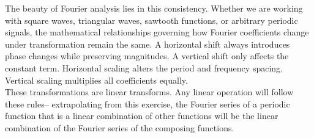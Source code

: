 \documentclass{article}
\begin{document}
The beauty of Fourier analysis lies in this consistency. Whether we are working with square waves, triangular waves, sawtooth functions, or arbitrary periodic signals, the mathematical relationships governing how Fourier coefficients change under transformation remain the same. A horizontal shift always introduces phase changes while preserving magnitudes. A vertical shift only affects the constant term. Horizontal scaling alters the period and frequency spacing. Vertical scaling multiplies all coefficients equally.\\

These transformations are linear transforms. Any linear operation will follow these rules-- extrapolating from this exercise, the Fourier series of a periodic function that is a linear combination of other functions will be the linear combination of the Fourier series of the composing functions.\\
\end{document}
